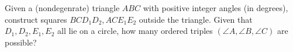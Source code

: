 Given a (nondegenrate) triangle $ABC$ with positive integer angles (in degrees), construct squares $BCD_1D_2, ACE_1E_2$ outside the triangle. Given that $D_1, D_2, E_1, E_2$ all lie on a circle, how many ordered triples $(\angle A, \angle B, \angle C)$ are possible?

